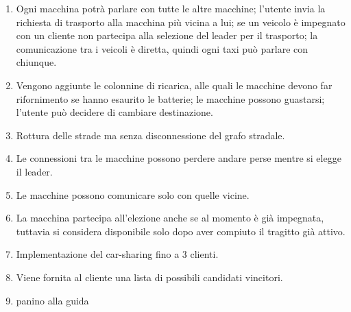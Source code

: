 \begin{enumerate}
	\item Ogni macchina potrà parlare con tutte le altre macchine; l'utente invia la richiesta di trasporto alla macchina più vicina a lui; se un veicolo è impegnato con un cliente non partecipa alla selezione del leader per il trasporto; la comunicazione tra i veicoli è diretta, quindi ogni taxi può parlare con chiunque.
	\item Vengono aggiunte le colonnine di ricarica, alle quali le macchine devono far rifornimento se hanno esaurito le batterie; le macchine possono guastarsi; l'utente può decidere di cambiare destinazione.
	\item Rottura delle strade ma senza disconnessione del grafo stradale.
	\item Le connessioni tra le macchine possono perdere andare perse mentre si elegge il leader.
	\item Le macchine possono comunicare solo con quelle vicine.
	\item La macchina partecipa all'elezione anche se al momento è già impegnata, tuttavia si considera disponibile solo dopo aver compiuto il tragitto già attivo.
	\item Implementazione del car-sharing fino a 3 clienti.
	\item Viene fornita al cliente una lista di possibili candidati vincitori.
	\item panino alla guida
\end{enumerate}